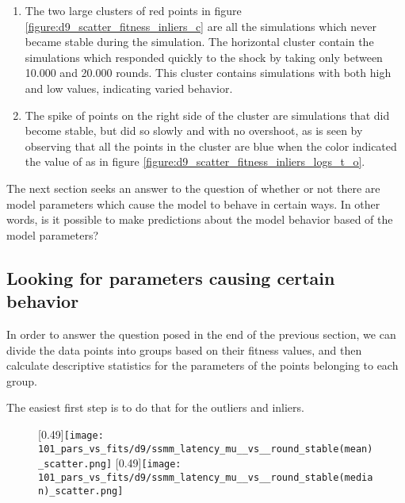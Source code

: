 \begin{enumerate}
\item The two large clusters of red points in figure \ref{figure:d9_scatter_fitness_inliers_c} are all the simulations which never became stable during the simulation. The horizontal cluster contain the simulations which responded quickly to the shock by taking only between 10.000 and 20.000 rounds. This cluster contains simulations with both high and low \stdev values, indicating varied behavior.
\item The spike of points on the right side of the cluster are simulations that did become stable, but did so slowly and with no overshoot, as is seen by observing that all the points in the cluster are blue when the color indicated the value of \overshoot as in figure \ref{figure:d9_scatter_fitness_inliers_logs_t_o}.
\end{enumerate}











The next section seeks an answer to the question of whether or not there are model parameters which cause the model to behave in certain ways.
In other words, is it possible to make predictions about the model behavior based of the model parameters?










\subsection{Looking for parameters causing certain behavior}
In order to answer the question posed in the end of the previous section, we can divide the data points into groups based on their fitness values, and then calculate descriptive statistics for the parameters of the points belonging to each group. 

The easiest first step is to do that for the outliers and inliers.


\begin{figure}
\subcaptionbox{}
[0.49\linewidth]{\texttt{[image: 101\_pars\_vs\_fits/d9/ssmm\_latency\_mu\_\_vs\_\_round\_stable(mean)\_scatter.png]}}
\subcaptionbox{}
[0.49\linewidth]{\texttt{[image: 101\_pars\_vs\_fits/d9/ssmm\_latency\_mu\_\_vs\_\_round\_stable(median)\_scatter.png]}}
\caption{}
\label{figure:d9_parvsfit_ssmm_latency_mu__vs__round_stable(median)_scatter}
\end{figure}




